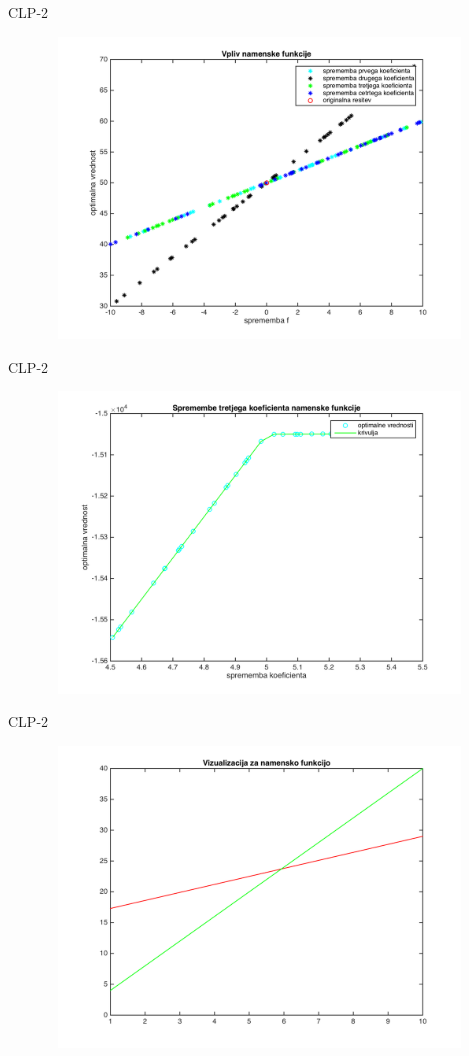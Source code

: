 \documentclass[t]{beamer}
\begin{document}
\begin{frame}{CLP-2}
\begin{figure}[h]
\includegraphics[width=11.2cm,height=8cm]{spremembe_f.png}
\end{figure}
\end{frame}

\begin{frame}{CLP-2}
\begin{figure}[h]
\includegraphics[width=11.2cm,height=8cm]{spremembe_f3.png}
\end{figure}
\end{frame}

\begin{frame}{CLP-2}
\begin{figure}[h]
\includegraphics[width=11.2cm,height=8cm]{razlaga1.png}
\end{figure}
\end{frame}
\end{document}
